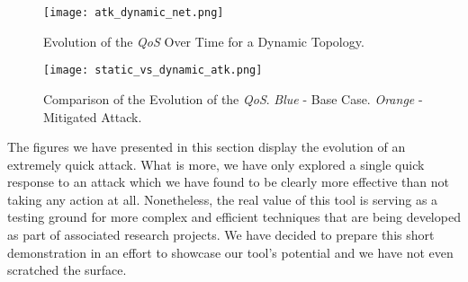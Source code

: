             \begin{figure}
                \centering
                \texttt{[image: atk\_dynamic\_net.png]}
                \caption[\textit{QoS} on a Dynamic Topology]{Evolution of the \textit{QoS} Over Time for a Dynamic Topology.}
                \label{fig:dynamic-atk}
            \end{figure}

            \begin{figure}
                \centering
                \texttt{[image: static\_vs\_dynamic\_atk.png]}
                \caption[Attack Mitigation Effect vs. Baseline Case]{Comparison of the Evolution of the \textit{QoS}. \textit{Blue} - Base Case. \textit{Orange} - Mitigated Attack.}
                \label{fig:atk-comparison}
            \end{figure}

            

        The figures we have presented in this section display the evolution of an extremely quick attack. What is more, we have only explored a single quick response to an attack which we have found to be clearly more effective than not taking any action at all. Nonetheless, the real value of this tool is serving as a testing ground for more complex and efficient techniques that are being developed as part of associated research projects. We have decided to prepare this short demonstration in an effort to showcase our tool's potential and we have not even scratched the surface.\\
